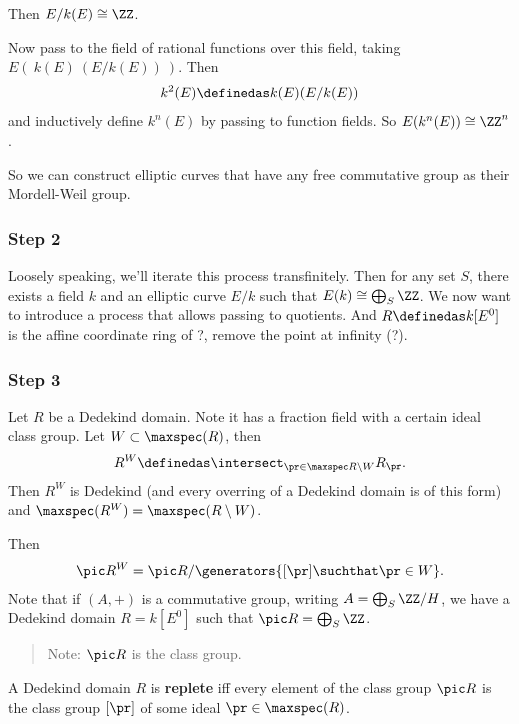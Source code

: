Then \(E/k(E) \cong \ZZ\).

Now pass to the field of rational functions over this field, taking
\(E(~k(E) ~(E/k(E))~)\). Then
\begin{align*}
k^2(E) \definedas k(E) (E/k(E))
\end{align*} and inductively define \(k^n(E)\) by passing to function
fields. So \(E(k^n (E)) \cong \ZZ^n\).

So we can construct elliptic curves that have any free commutative group
as their Mordell-Weil group.

\hypertarget{step-2}{%
\subsubsection{Step 2}\label{step-2}}

Loosely speaking, we'll iterate this process transfinitely. Then for any
set \(S\), there exists a field \(k\) and an elliptic curve \(E/k\) such
that \(E(k) \cong \bigoplus_S \ZZ\). We now want to introduce a process
that allows passing to quotients. And \(R \definedas k[E^0]\) is the
affine coordinate ring of ?, remove the point at infinity (?).

\hypertarget{step-3}{%
\subsubsection{Step 3}\label{step-3}}

Let \(R\) be a Dedekind domain. Note it has a fraction field with a
certain ideal class group. Let \(W \subset \maxspec(R)\), then
\begin{align*}R^W \definedas \intersect_{\pr \in \maxspec R\setminus W} R_\pr.\end{align*}
Then \(R^W\) is Dedekind (and every overring of a Dedekind domain is of
this form) and \(\maxspec(R^W) = \maxspec(R\setminus W)\).

Then
\begin{align*}\pic R^W = \pic R / \generators{ [\pr] \suchthat \pr\in W }.\end{align*}
Note that if \((A, +)\) is a commutative group, writing
\(A = \bigoplus_S \ZZ/H\), we have a Dedekind domain \(R = k[E^0]\) such
that \(\pic R = \bigoplus_S \ZZ\).

\begin{quote}
Note: \(\pic R\) is the class group.
\end{quote}

\begin{description}
\tightlist
\item[Definition (Replete)]
A Dedekind domain \(R\) is \textbf{replete} iff every element of the
class group \(\pic R\) is the class group \([\pr]\) of some ideal
\(\pr \in \maxspec(R)\).
\end{description}


